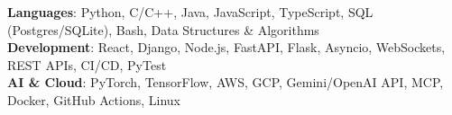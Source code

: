\begin{itemize}[leftmargin=0.15in, label={}]
    \small{\item{
     \textbf{Languages}{: Python, C/C++, Java, JavaScript, TypeScript, SQL (Postgres/SQLite), Bash, Data Structures \& Algorithms} \\
     \textbf{Development}{: React, Django, Node.js, FastAPI, Flask, Asyncio, WebSockets, REST APIs, CI/CD, PyTest} \\
     \textbf{AI \& Cloud}{: PyTorch, TensorFlow, AWS, GCP, Gemini/OpenAI API, MCP, Docker, GitHub Actions, Linux}
    }}
\end{itemize}
